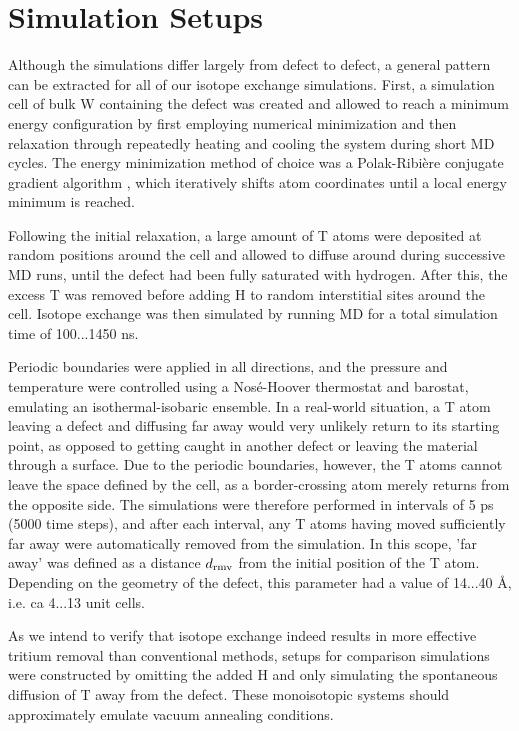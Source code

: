 \section{Simulation Setups}
Although the simulations differ largely from defect to defect, a general pattern can be extracted for all of our isotope exchange simulations. 
First, a simulation cell of bulk W containing the defect was created and allowed to reach a minimum energy configuration by first employing numerical minimization and then relaxation through repeatedly heating and cooling the system during short MD cycles. 
The energy minimization method of choice was a Polak-Ribi\`{e}re conjugate gradient algorithm \cite{polak1969note}, which iteratively shifts atom coordinates until a local energy minimum is reached. 

Following the initial relaxation, a large amount of T atoms were deposited at random positions around the cell and allowed to diffuse around during successive MD runs, until the defect had been fully saturated with hydrogen.
After this, the excess T was removed before adding H to random interstitial sites around the cell. 
Isotope exchange was then simulated by running MD for a total simulation time of 100...1450 ns. 

Periodic boundaries were applied in all directions, and the pressure and temperature were controlled using a Nos\'{e}-Hoover thermostat and barostat, emulating an isothermal-isobaric ensemble. 
In a real-world situation, a T atom leaving a defect and diffusing far away would very unlikely return to its starting point, as opposed to getting caught in another defect or leaving the material through a surface. 
Due to the periodic boundaries, however, the T atoms cannot leave the space defined by the cell, as a border-crossing atom merely returns from the opposite side. 
The simulations were therefore performed in intervals of 5 ps (5000 time steps), and after each interval, any T atoms having moved sufficiently far away were automatically removed from the simulation. 
In this scope, 'far away' was defined as a distance $d_{\rm{rmv}} $ from the initial position of the T atom. 
Depending on the geometry of the defect, this parameter had a value of 14...40 \AA, i.e. ca 4...13 unit cells.

As we intend to verify that isotope exchange indeed results in more effective tritium removal than conventional methods, setups for comparison simulations were constructed by omitting the added H and only simulating the spontaneous diffusion of T away from the defect. 
These monoisotopic systems should approximately emulate vacuum annealing conditions.

